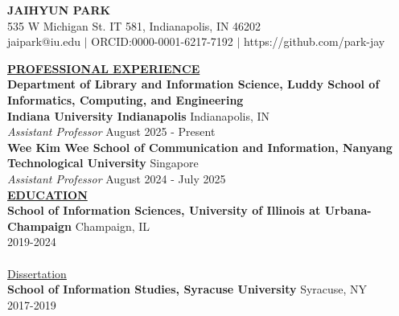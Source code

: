 \documentclass{article}
\begin{document}
\begin{center}
\thispagestyle{empty}
\large \textbf{JAIHYUN PARK\\}
\normalsize 535 W Michigan St. IT 581, Indianapolis, IN 46202 \\ 
\normalsize jaipark@iu.edu $\mid$ ORCID:0000-0001-6217-7192 $\mid$ https://github.com/park-jay \\
\hrulefill
\end{center}


\noindent \textbf{\underline{PROFESSIONAL EXPERIENCE}} \\
\noindent \textbf{Department of Library and Information Science, Luddy School of Informatics, Computing, and Engineering} \\
\noindent \textbf{Indiana University Indianapolis} \hfill Indianapolis, IN \\
\noindent \textit{Assistant Professor} \hfill August 2025 - Present \\

\noindent \textbf{Wee Kim Wee School of Communication and Information, Nanyang Technological University} \hfill Singapore \\
\noindent \textit{Assistant Professor} \hfill August 2024 - July 2025 \\


\noindent \textbf{\underline{EDUCATION}} \\
\noindent \textbf{School of Information Sciences, University of Illinois at Urbana-Champaign} \hfill Champaign, IL \\
 \hfill 2019-2024\\
\\
 \hfill \href{https://hdl.handle.net/2142/125699}{Dissertation} \\

\noindent \textbf{School of Information Studies, Syracuse University} \hfill Syracuse, NY \\
 \hfill 2017-2019 \\
 \hfill \\
 \\
\end{document}
